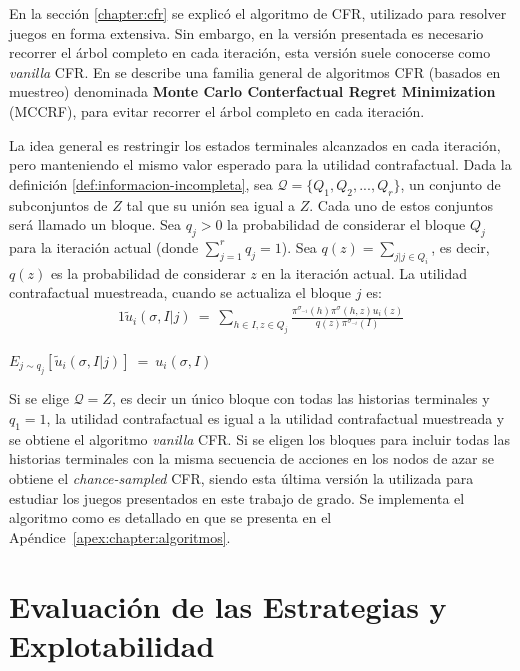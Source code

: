 En la sección \ref{chapter:cfr} se explicó el algoritmo de CFR, utilizado para resolver juegos en forma extensiva. Sin embargo, en la versión presentada es necesario recorrer el árbol completo en cada iteración, esta versión suele conocerse como \textit{vanilla} CFR. En \cite{bib:montecarlo-cfr} se describe una familia general de algoritmos CFR (basados en muestreo) denominada \textbf{Monte Carlo Conterfactual Regret Minimization} (MCCRF), para evitar recorrer el árbol completo en cada iteración.

La idea general es restringir los estados terminales alcanzados en cada iteración, pero manteniendo el mismo valor esperado para la utilidad contrafactual. Dada la definición \ref{def:informacion-incompleta}, sea $\mathcal{Q} = \{Q_1, Q_2, ..., Q_r\}$, un conjunto de subconjuntos de $Z$ tal que su unión sea igual a $Z$. Cada uno de estos conjuntos será llamado un bloque. Sea $q_j > 0$ la probabilidad de considerar el bloque $Q_j$ para la iteración actual (donde $\sum_{j = 1}^r {q_j} = 1$). 
Sea $q(z) = \sum_{j | j \in Q_i}$, es decir, $q(z)$ es la probabilidad de considerar $z$ en la iteración actual. La utilidad contrafactual muestreada, cuando se actualiza el bloque $j$ es:
\begin{alignat}{1}
\tilde{u}_i(\sigma, I | j)\ =\ \sum_{h \in I, z \in Q_j} \frac{\pi^{\sigma_{-i}}(h) \pi^{\sigma}(h, z) u_i(z)}{q(z) \pi^{\sigma_{-i}}(I)}
\end{alignat}

\begin{theorem}
$E_{j \sim q_j} [\tilde{u}_i(\sigma, I | j)]\ =\ u_i(\sigma, I)$
\end{theorem}

Si se elige $\mathcal{Q} = {Z}$, es decir un único bloque con todas las historias terminales y $q_1 = 1$, la utilidad contrafactual es igual a la utilidad contrafactual muestreada y se obtiene el algoritmo \textit{vanilla} CFR. Si se eligen los bloques para incluir todas las historias terminales con la misma secuencia de acciones en los nodos de azar se obtiene el \textit{chance-sampled} CFR, siendo esta última versión la utilizada para estudiar los juegos presentados en este trabajo de grado. Se implementa el algoritmo como es detallado en \cite{bib:introductionCFR} que se presenta en el Apéndice~\ref{apex:chapter:algoritmos}.


\section{Evaluación de las Estrategias y Explotabilidad}

